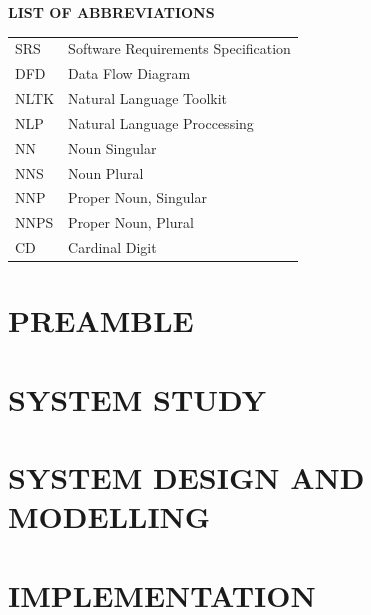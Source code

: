 \documentclass[a4 paper,11pt]{report}
\begin{document}
\newpage
\tableofcontents
\thispagestyle{empty}

\newpage
{}
\listoffigures
\renewcommand{\thepage}{\roman{page}}
\setcounter{page}{1}

\newpage
{}
\listoftables

\newpage

\begin{center}
\Large \textbf{LIST OF ABBREVIATIONS}

\vspace{1cm}
\setcounter{page}{3}
\begin{tabular}{l l}
SRS & Software Requirements Specification \\
DFD & Data Flow Diagram \\
NLTK & Natural Language Toolkit \\
NLP & Natural Language Proccessing \\
NN	& Noun Singular \\
NNS	& Noun Plural \\
NNP	& Proper Noun, Singular \\
NNPS& Proper Noun, Plural \\
CD	& Cardinal Digit \\
\end{tabular}
\end{center}

\clearpage
\pagestyle{plain}
\renewcommand{\thepage}{\arabic{page}}
\setcounter{page}{1}
\chapter{PREAMBLE}
\pagestyle{fancy}
\lhead{}
\renewcommand{\headrulewidth}{0pt}
\renewcommand{\footrulewidth}{0pt}


\chapter{SYSTEM STUDY}


\chapter{SYSTEM DESIGN AND MODELLING}


\chapter{IMPLEMENTATION}

\end{document}
